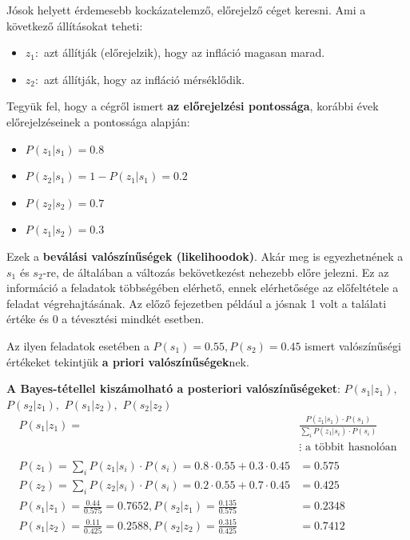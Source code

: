 \documentclass[a4paper,12pt]{article}
\begin{document}
Jósok helyett érdemesebb kockázatelemző, előrejelző céget keresni. Ami a következő állításokat teheti:
\begin{itemize}
\item $z_{1}:$ azt állítják (előrejelzik), hogy az infláció magasan marad.  %
\item $z_{2}:$ azt állítják, hogy az infláció mérséklődik. %
\end{itemize}

Tegyük fel, hogy a cégről ismert \textbf{az előrejelzési pontossága}, korábbi évek előrejelzéseinek a pontossága alapján:
\begin{itemize}
\item $P(z_{1}|s_1) = 0.8$ 
\item $P(z_{2}|s_1) = 1- P(z_{1}|s_1) = 0.2$
\item $P(z_{2}|s_2) = 0.7$ 
\item $P(z_{1}|s_2) = 0.3$ 
\end{itemize}
Ezek a \textbf{beválási valószínűségek (likelihoodok)}. Akár meg is egyezhetnének a $s_1$ és $s_2$-re, de általában a változás bekövetkezést nehezebb előre jelezni. Ez az információ a feladatok többségében elérhető, ennek elérhetősége az előfeltétele a feladat végrehajtásának. Az előző fejezetben például a jósnak 1 volt a találati értéke és 0 a tévesztési mindkét esetben.

Az ilyen feladatok esetében a $P(s_1) = 0.55 , P(s_2) = 0.45$ ismert valószínűségi értékeket tekintjük \textbf{a priori valószínűségek}nek. 

\textbf{A Bayes-tétellel kiszámolható a posteriori valószínűségeket}: $P(s_1|z_1),$ $P(s_2|z_1),$ $ P(s_1|z_2),$ $P(s_2|z_2)$
\begin{equation}
\begin{split}
P(s_1|z_1) =& \frac{P(z_{1}|s_1) \cdot  P(s_1)}{\sum_{i}^{ } P(z_{1}|s_i) \cdot  P(s_i)} \\
&\vdots \text{ a többit hasnolóan} \\
\\
P(z_1)=\sum_{i}^{ } P(z_{1}|s_i) \cdot  P(s_i) =  0.8\cdot 0.55+0.3\cdot 0.45 &= 0.575 \\
P(z_2)=\sum_{i}^{ } P(z_{2}|s_i) \cdot  P(s_i) =  0.2\cdot 0.55+0.7\cdot 0.45 &= 0.425 \\
P(s_1|z_1) = \frac{0.44}{0.575} = 0.7652,  
P(s_2|z_1) = \frac{0.135}{0.575} &= 0.2348 \\
P(s_1|z_2) = \frac{0.11}{0.425} = 0.2588,
P(s_2|z_2) = \frac{0.315}{0.425} &= 0.7412
\\
\end{split}
\end{equation}
\end{document}
